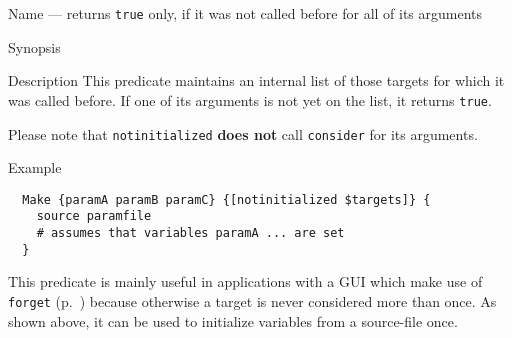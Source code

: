 \documentclass[11pt]{scrartcl}
\begin{document}
\label{pred:notinitialized}
\begin{Describe}
\item[Name]  --- returns \texttt{true} only, if
  it was not called before for all of its arguments
\item[Synopsis]  
\item[Description] This predicate maintains an internal list of those
  targets for which it was called before. If one of its arguments is
  not yet on the list, it returns \texttt{true}.
  
  Please note that \texttt{notinitialized} \textbf{does not} call
  \texttt{consider} for its arguments.
\item[Example]
\begin{verbatim}
  Make {paramA paramB paramC} {[notinitialized $targets]} {
    source paramfile    
    # assumes that variables paramA ... are set 
  }
\end{verbatim} 
  This predicate is mainly useful in applications with a GUI which
  make use of \texttt{forget} (p.~\pageref{proc:forget}) because
  otherwise a target is never considered more than once. As shown
  above, it can be used to initialize variables from a source-file once.
\end{Describe}
\end{document}
